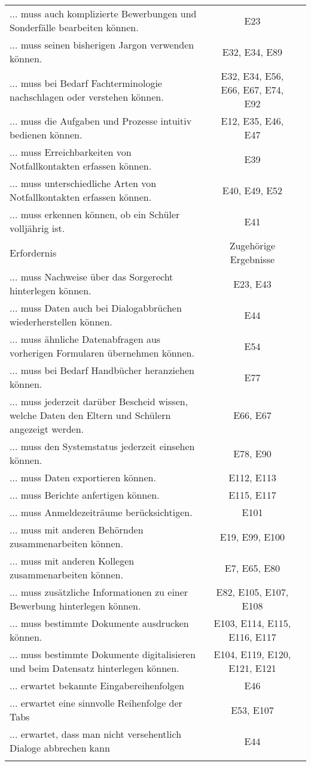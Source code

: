 \begin{landscape}
\begin{longtable}{p{15cm}cc}
... muss auch komplizierte Bewerbungen und Sonderfälle bearbeiten können. & E23 \\
... muss seinen bisherigen Jargon verwenden können. & E32, E34, E89 \\
... muss bei Bedarf Fachterminologie nachschlagen oder verstehen können. & E32, E34, E56, E66, E67, E74, E92 \\
... muss die Aufgaben und Prozesse intuitiv bedienen können. & E12, E35, E46, E47 \\
... muss Erreichbarkeiten von Notfallkontakten erfassen können. & E39 \\
... muss unterschiedliche Arten von Notfallkontakten erfassen können. & E40, E49, E52 \\
... muss erkennen können, ob ein Schüler volljährig ist. & E41 \\
        \endfirsthead
        \toprule
        Erfordernis & Zugehörige Ergebnisse \\
        \midrule
        \endhead
        \bottomrule
        \endfoot
... muss Nachweise über das Sorgerecht hinterlegen können. & E23, E43 \\
... muss Daten auch bei Dialogabbrüchen wiederherstellen können. & E44 \\
... muss ähnliche Datenabfragen aus vorherigen Formularen übernehmen können. & E54 \\
... muss bei Bedarf Handbücher heranziehen können. & E77 \\
... muss jederzeit darüber Bescheid wissen, welche Daten den Eltern und Schülern angezeigt werden. & E66, E67 \\
... muss den Systemstatus jederzeit einsehen können. & E78, E90 \\
... muss Daten exportieren können. & E112, E113 \\
... muss Berichte anfertigen können. & E115, E117 \\
... muss Anmeldezeiträume berücksichtigen. & E101 \\
... muss mit anderen Behörnden zusammenarbeiten können. & E19, E99, E100 \\
... muss mit anderen Kollegen zusammenarbeiten können. & E7, E65, E80 \\
... muss zusätzliche Informationen zu einer Bewerbung hinterlegen können. & E82, E105, E107, E108 \\
... muss bestimmte Dokumente ausdrucken können. & E103, E114, E115, E116, E117 \\
... muss bestimmte Dokumente digitalisieren und beim Datensatz hinterlegen können. & E104, E119, E120, E121, E121 \\
... erwartet bekannte Eingabereihenfolgen & E46 \\
... erwartet eine sinnvolle Reihenfolge der Tabs & E53, E107 \\
... erwartet, dass man nicht versehentlich Dialoge abbrechen kann & E44 \\
    \label{tab:erfordernisse}
\end{longtable}



\end{landscape}
